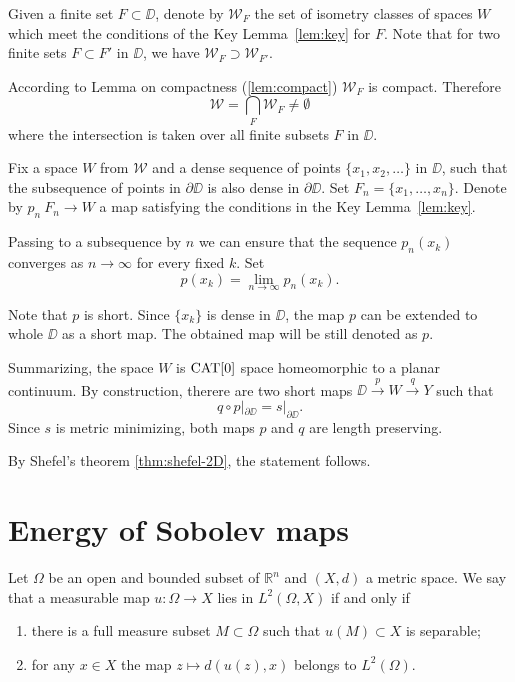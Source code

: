 \documentclass[a4paper,10pt]{amsart}
\begin{document}
Given a finite set $F\subset \DD$,
denote by $\mathcal{W}_F$
the set of isometry classes of spaces $W$ which meet the conditions of the Key Lemma~\ref{lem:key}
for $F$.
Note that for two finite sets $F\subset F'$ in $\DD$,
we have $\mathcal{W}_F\supset \mathcal{W}_{F'}$.

According to Lemma on compactness (\ref{lem:compact}) $\mathcal{W}_F$ is compact.
Therefore 
\[\mathcal{W}
=
\bigcap_{F}\mathcal{W}_F\ne \emptyset\]
where the intersection is taken over all finite subsets $F$ in $\DD$.

Fix a space $W$ from $\mathcal{W}$
and a dense sequence of points $\{x_1,x_2,\dots\}$ in $\DD$,
such that the subsequence of points in $\partial \DD$
is also dense in $\partial \DD$.
Set $F_n=\{x_1,\dots,x_n\}$.
Denote by $p_n\:F_n\to W$ a map satisfying the conditions in the Key Lemma~\ref{lem:key}.

Passing to a subsequence by $n$ we can ensure that the sequence
$p_n(x_k)$ converges as $n\to\infty$ for every fixed $k$.
Set 
\[p(x_k)=\lim_{n\to\infty} p_n(x_k).\]

Note that $p$ is short.
Since $\{x_k\}$ is dense in $\DD$,
the map $p$ can be extended to whole $\DD$ 
as a short map.
The obtained map will be still denoted as $p$.

Summarizing, the space $W$ is $\mathop{\rm CAT}\nolimits[0]$ space 
homeomorphic to a planar continuum.
By construction, therere are two short maps 
$\DD\xrightarrow{p} W \xrightarrow{q} Y$
such that 
\[q\circ p|_{\partial\DD}=s|_{\partial\DD}.\]
Since $s$ is metric minimizing, both maps $p$ and $q$ are length preserving.

By Shefel's theorem \ref{thm:shefel-2D}, the statement follows.\qeds

\section{Energy of Sobolev maps}


Let $\Omega$ be an open and bounded subset of $\mathbb{R}^n$ and $(X,d)$ a metric space.
We say that a measurable map $u:\Omega\to X$ lies in 
$L^2(\Omega,X)$ if and only if
\begin{enumerate}
 \item there is a full measure subset $M\subset \Omega$ such that $u(M)\subset X$ is separable;
 \item for any $x\in X$ the map $z\mapsto d(u(z),x)$ belongs to $L^2(\Omega)$.
\end{enumerate}
\end{document}
